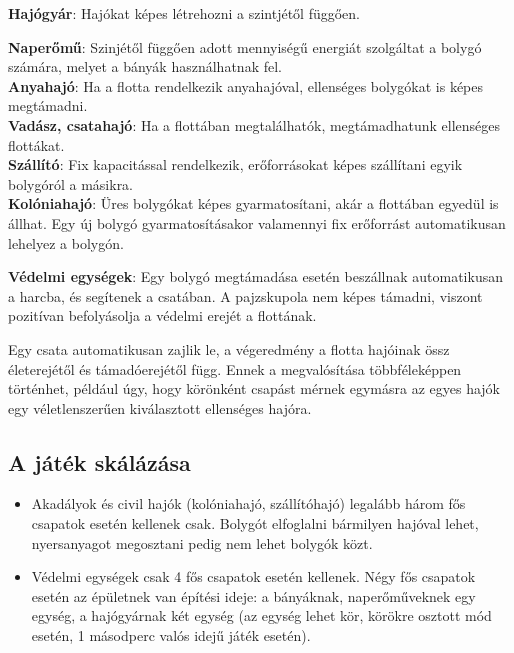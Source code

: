 \documentclass[12pt,a4paper]{article}
\begin{document}
\textbf{Hajógyár}: Hajókat képes létrehozni a szintjétől függően.

\textbf{Naperőmű}: Szinjétől függően adott mennyiségű energiát szolgáltat a bolygó számára, melyet a bányák használhatnak fel. \\

\textbf{Anyahajó}: Ha a flotta rendelkezik anyahajóval, ellenséges bolygókat is képes megtámadni. \\

\textbf{Vadász, csatahajó}: Ha a flottában megtalálhatók, megtámadhatunk ellenséges flottákat. \\

\textbf{Szállító}: Fix kapacitással rendelkezik, erőforrásokat képes szállítani egyik bolygóról a másikra. \\

\textbf{Kolóniahajó}: Üres bolygókat képes gyarmatosítani, akár a flottában egyedül is állhat. Egy új bolygó gyarmatosításakor valamennyi fix erőforrást automatikusan lehelyez a bolygón.

\textbf{Védelmi egységek}: Egy bolygó megtámadása esetén beszállnak automatikusan a harcba, és segítenek a csatában. A pajzskupola nem képes támadni, viszont pozitívan befolyásolja a védelmi erejét a flottának.

Egy csata automatikusan zajlik le, a végeredmény a flotta hajóinak össz életerejétől és támadóerejétől függ. Ennek a megvalósítása többféleképpen történhet, például úgy, hogy körönként csapást mérnek egymásra az egyes hajók egy véletlenszerűen kiválasztott ellenséges hajóra.


\subsection{A játék skálázása}
\begin{itemize}
\item Akadályok és civil hajók (kolóniahajó, szállítóhajó) legalább három fős csapatok esetén kellenek csak. Bolygót elfoglalni bármilyen hajóval lehet, nyersanyagot megosztani pedig nem lehet bolygók közt.

\item Védelmi egységek csak 4 fős csapatok esetén kellenek. Négy fős csapatok esetén az épületnek van építési ideje: a bányáknak, naperőműveknek egy egység, a hajógyárnak két egység (az egység lehet kör, körökre osztott mód esetén, 1 másodperc valós idejű játék esetén). 
\end{itemize}
\end{document}
